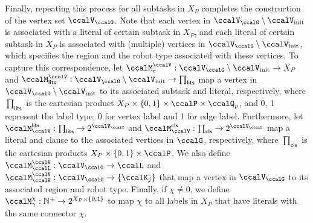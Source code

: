 \documentclass[Afour,sageh,times]{sagej}
\begin{document}
Finally, repeating this process for all subtasks in $X_{P}$ completes the construction of the vertex set $\ccalV_\ccalG$. Note that each vertex in $\ccalV_\ccalG\setminus \ccalV_{\text{init}}$ is associated with a literal of certain subtask in $X_P$, and each literal of certain subtask in $X_P$ is associated with (multiple) vertices in $\ccalV_\ccalG\setminus \ccalV_{\text{init}}$, which specifies the region and the robot type associated with these vertices.
To capture this correspondence, let $\ccalM^\ccalV_{e} : \ccalV_{\ccalG}\setminus \ccalV_{\text{init}} \to  X_{P} $ and $\ccalM^\ccalV_{\mathsf{lits}}  : \ccalV_\ccalG\setminus \ccalV_\text{init}  \to  \prod_{\mathsf{lits}} $  map a vertex in $\ccalV_\ccalG \setminus \ccalV_{\text{init}}$ to its associated subtask and literal, respectively, where $\prod_{\mathsf{lits}}$ is the cartesian product $ X_{P} \times\{0, 1\} \times \ccalP  \times \ccalQ_p$, and 0, 1 represent the label type, 0 for vertex label and 1 for edge label. Furthermore, let $\ccalM^\mathsf{lits}_{\ccalV}:   \prod_{\mathsf{lits}}  \to  2^{\ccalV_\ccalG}$ and $\ccalM^\mathsf{cls}_{\ccalV} :  \prod_{\mathsf{cls}} \to  2^{\ccalV_\ccalG}$ map a literal and clause to the associated vertices in $\ccalG$, respectively, where $\prod_{\mathsf{cls}}$ is the cartesian products $X_{P}\times \{0, 1\} \times \ccalP$. We also define $\ccalM^{\ccalV}_\ccalL :  \ccalV_\ccalG  \to  \ccalL$ and $ \ccalM^{\ccalV}_\ccalK :  {\ccalV_\ccalG}  \to  \{\ccalK_j\}$ that map a vertex in $\ccalV_\ccalG$ to its associated  region and robot type. Finally, if $\chi\not=0$, we define  $\ccalM_{\gamma}^\chi: \mathbb{N}^+ \to 2^{X_{P}\times \{0,1\}}$ to map $\chi$ to all labels in $X_P$ that have literals with the same connector $\chi$.
\end{document}
